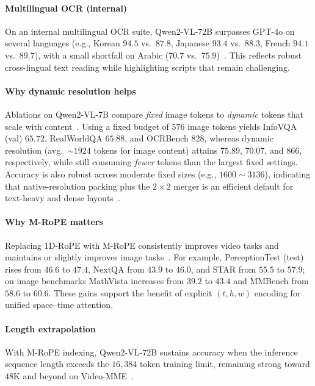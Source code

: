 \begin{enrichment}
\begin{enrichment}
        \paragraph{Multilingual OCR (internal)}
        On an internal multilingual OCR suite, Qwen2\mbox{-}VL\mbox{-}72B surpasses GPT\mbox{-}4o on several languages (e.g., Korean $94.5$ vs.\ $87.8$, Japanese $93.4$ vs.\ $88.3$, French $94.1$ vs.\ $89.7$), with a small shortfall on Arabic ($70.7$ vs.\ $75.9$)~\cite[Table~3]{wang2024_qwen2vl}. This reflects robust cross\mbox{-}lingual text reading while highlighting scripts that remain challenging.
        
        \paragraph{Why dynamic resolution helps}
        Ablations on Qwen2\mbox{-}VL\mbox{-}7B compare \emph{fixed} image tokens to \emph{dynamic} tokens that scale with content~\cite[Table~7]{wang2024_qwen2vl}. Using a fixed budget of $576$ image tokens yields InfoVQA (val) $65.72$, RealWorldQA $65.88$, and OCRBench $828$, whereas dynamic resolution (avg.\ $\sim 1924$ tokens for image content) attains $75.89$, $70.07$, and $866$, respectively, while still consuming \emph{fewer} tokens than the largest fixed settings. Accuracy is also robust across moderate fixed sizes (e.g., $1600{\sim}3136$), indicating that native-resolution packing plus the $2{\times}2$ merger is an efficient default for text\mbox{-}heavy and dense layouts~\cite[Table~7]{wang2024_qwen2vl}.
        
        \newpage
        
        \paragraph{Why M\mbox{-}RoPE matters}
        Replacing 1D\mbox{-}RoPE with M\mbox{-}RoPE consistently improves video tasks and maintains or slightly improves image tasks~\cite[Table~8]{wang2024_qwen2vl}. For example, PerceptionTest (test) rises from $46.6$ to $47.4$, NextQA from $43.9$ to $46.0$, and STAR from $55.5$ to $57.9$; on image benchmarks MathVista increases from $39.2$ to $43.4$ and MMBench from $58.6$ to $60.6$. These gains support the benefit of explicit $(t,h,w)$ encoding for unified space–time attention.
        
        \paragraph{Length extrapolation}
        With M\mbox{-}RoPE indexing, Qwen2\mbox{-}VL\mbox{-}72B sustains accuracy when the inference sequence length exceeds the $16{,}384$ token training limit, remaining strong toward $48$K and beyond on Video\mbox{-}MME~\cite[Fig.~5]{wang2024_qwen2vl}.
        

\end{enrichment}
\end{enrichment}
